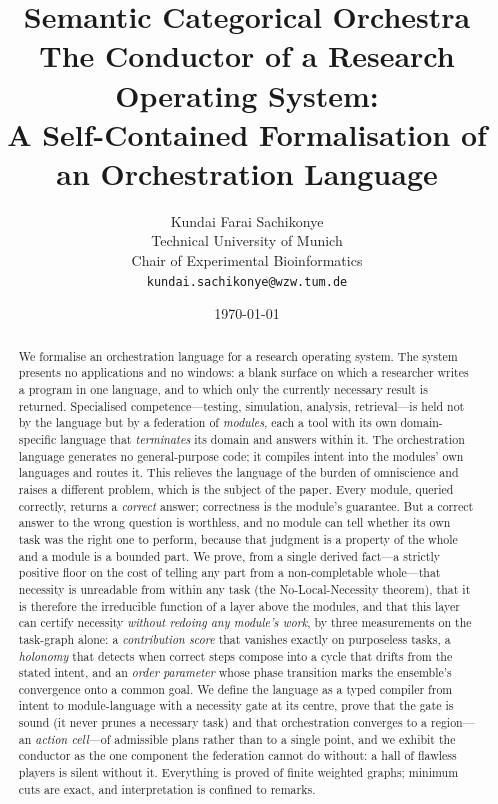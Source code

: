 \documentclass[twocolumn,11pt,a4paper]{article}
\title{\textbf{Semantic Categorical Orchestra}\\[3pt]
\large The Conductor of a Research Operating System:\\
A Self-Contained Formalisation of an Orchestration Language}
\author{%
Kundai Farai Sachikonye\\[2pt]
\small Technical University of Munich\\
\small Chair of Experimental Bioinformatics\\
\small \texttt{kundai.sachikonye@wzw.tum.de}}
\date{\today}
\theoremstyle{sup}
\theoremstyle{definition}
\theoremstyle{remark}
\begin{document}
\maketitle

\begin{abstract}
\noindent
We formalise an orchestration language for a research operating system. The
system presents no applications and no windows: a blank surface on which a
researcher writes a program in one language, and to which only the currently
necessary result is returned. Specialised competence---testing, simulation,
analysis, retrieval---is held not by the language but by a federation of
\emph{modules}, each a tool with its own domain-specific language that
\emph{terminates} its domain and answers within it. The orchestration language
generates no general-purpose code; it compiles intent into the modules' own
languages and routes it. This relieves the language of the burden of omniscience
and raises a different problem, which is the subject of the paper. Every module,
queried correctly, returns a \emph{correct} answer; correctness is the module's
guarantee. But a correct answer to the wrong question is worthless, and no module
can tell whether its own task was the right one to perform, because that judgment
is a property of the whole and a module is a bounded part. We prove, from a
single derived fact---a strictly positive floor on the cost of telling any part
from a non-completable whole---that necessity is unreadable from within any task
(the No-Local-Necessity theorem), that it is therefore the irreducible function
of a layer above the modules, and that this layer can certify necessity
\emph{without redoing any module's work}, by three measurements on the
task-graph alone: a \emph{contribution score} that vanishes exactly on
purposeless tasks, a \emph{holonomy} that detects when correct steps compose into
a cycle that drifts from the stated intent, and an \emph{order parameter} whose
phase transition marks the ensemble's convergence onto a common goal. We define
the language as a typed compiler from intent to module-language with a necessity
gate at its centre, prove that the gate is sound (it never prunes a necessary
task) and that orchestration converges to a region---an \emph{action cell}---of
admissible plans rather than to a single point, and we exhibit the conductor as
the one component the federation cannot do without: a hall of flawless players is
silent without it. Everything is proved of finite weighted graphs; minimum cuts
are exact, and interpretation is confined to remarks.
\end{abstract}
\end{document}
